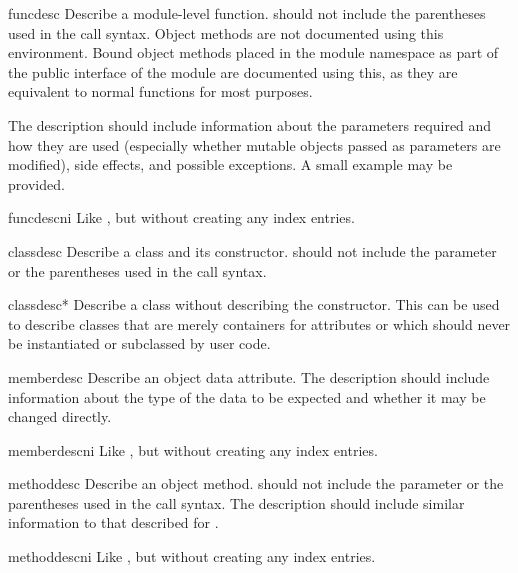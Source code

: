 \documentclass{howto}
\begin{document}
    \begin{envdesc}{funcdesc}{}
      Describe a module-level function.   should
      not include the parentheses used in the call syntax.  Object
      methods are not documented using this environment.  Bound object
      methods placed in the module namespace as part of the public
      interface of the module are documented using this, as they are
      equivalent to normal functions for most purposes.

      The description should include information about the parameters
      required and how they are used (especially whether mutable
      objects passed as parameters are modified), side effects, and
      possible exceptions.  A small example may be provided.
    \end{envdesc}
    \begin{envdesc}{funcdescni}{}
      Like , but without creating any index entries.
    \end{envdesc}

    \begin{envdesc}{classdesc}{}
      Describe a class and its constructor.   should not include the  parameter or
      the parentheses used in the call syntax.
    \end{envdesc}

    \begin{envdesc}{classdesc*}{}
      Describe a class without describing the constructor.  This can
      be used to describe classes that are merely containers for
      attributes or which should never be instantiated or subclassed
      by user code.
    \end{envdesc}

    \begin{envdesc}{memberdesc}{}
      Describe an object data attribute.  The description should
      include information about the type of the data to be expected
      and whether it may be changed directly.
    \end{envdesc}
    \begin{envdesc}{memberdescni}{}
      Like , but without creating any index entries.
    \end{envdesc}

    \begin{envdesc}{methoddesc}{}
      Describe an object method.   should not include
      the  parameter or the parentheses used in the call
      syntax.  The description should include similar information to
      that described for .
    \end{envdesc}
    \begin{envdesc}{methoddescni}{}
      Like , but without creating any index entries.
    \end{envdesc}
\end{document}
